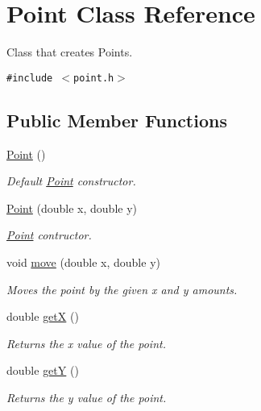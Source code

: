 \hypertarget{class_point}{
\section{Point Class Reference}
\label{class_point}
}
Class that creates Points.  


{\tt \#include $<$point.h$>$}

\subsection*{Public Member Functions}
\begin{CompactItemize}
\item 
\hyperlink{class_point_d92f2337b839a94ce97dcdb439b4325a}{Point} ()
\begin{CompactList}\small\item\em Default \hyperlink{class_point}{Point} constructor. \item\end{CompactList}\item 
\hyperlink{class_point_78b55e8d5466bb8c2cf60fa55f2562ff}{Point} (double x, double y)
\begin{CompactList}\small\item\em \hyperlink{class_point}{Point} contructor. \item\end{CompactList}\item 
void \hyperlink{class_point_84f2eee352c9d26963bca63a03eb7676}{move} (double x, double y)
\begin{CompactList}\small\item\em Moves the point by the given x and y amounts. \item\end{CompactList}\item 
double \hyperlink{class_point_8de35a6098cdd7267b4167776da83da6}{getX} ()
\begin{CompactList}\small\item\em Returns the x value of the point. \item\end{CompactList}\item 
double \hyperlink{class_point_a278c8bcb8aeb4101023a4baf473b547}{getY} ()
\begin{CompactList}\small\item\em Returns the y value of the point. \item\end{CompactList}\item 

\end{CompactItemize}
